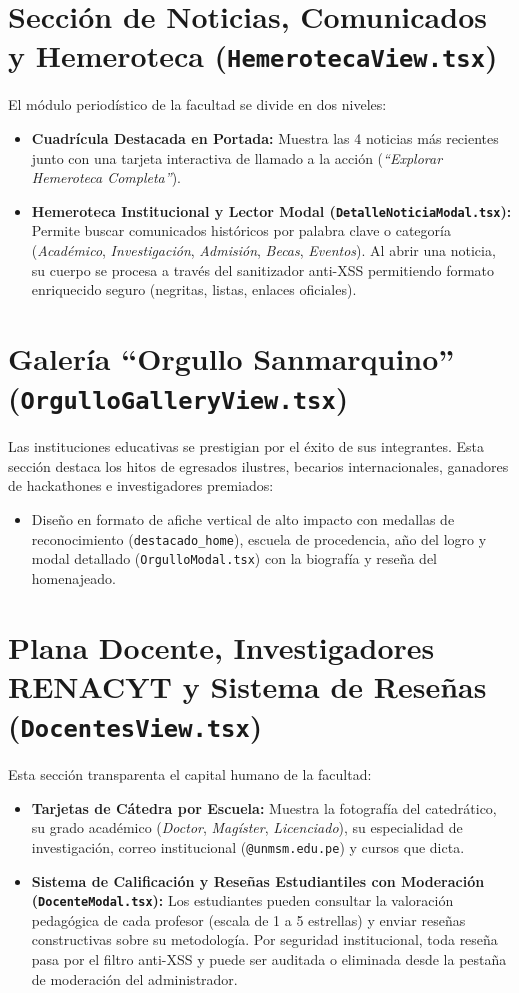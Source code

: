 \documentclass[12pt,a4paper,oneside]{report}
\begin{document}
\section{Sección de Noticias, Comunicados y Hemeroteca (\texttt{HemerotecaView.tsx})}
El módulo periodístico de la facultad se divide en dos niveles:
\begin{itemize}[leftmargin=1.0cm]
  \item \textbf{Cuadrícula Destacada en Portada:} Muestra las 4 noticias más recientes junto con una tarjeta interactiva de llamado a la acción (\textit{``Explorar Hemeroteca Completa''}).
  \item \textbf{Hemeroteca Institucional y Lector Modal (\texttt{DetalleNoticiaModal.tsx}):} Permite buscar comunicados históricos por palabra clave o categoría (\textit{Académico}, \textit{Investigación}, \textit{Admisión}, \textit{Becas}, \textit{Eventos}). Al abrir una noticia, su cuerpo se procesa a través del sanitizador anti-XSS permitiendo formato enriquecido seguro (negritas, listas, enlaces oficiales).
\end{itemize}

\section{Galería ``Orgullo Sanmarquino'' (\texttt{OrgulloGalleryView.tsx})}
Las instituciones educativas se prestigian por el éxito de sus integrantes. Esta sección destaca los hitos de egresados ilustres, becarios internacionales, ganadores de hackathones e investigadores premiados:
\begin{itemize}[leftmargin=1.0cm]
  \item Diseño en formato de afiche vertical de alto impacto con medallas de reconocimiento (\texttt{destacado\_home}), escuela de procedencia, año del logro y modal detallado (\texttt{OrgulloModal.tsx}) con la biografía y reseña del homenajeado.
\end{itemize}

\section{Plana Docente, Investigadores RENACYT y Sistema de Reseñas (\texttt{DocentesView.tsx})}
Esta sección transparenta el capital humano de la facultad:
\begin{itemize}[leftmargin=1.0cm]
  \item \textbf{Tarjetas de Cátedra por Escuela:} Muestra la fotografía del catedrático, su grado académico (\textit{Doctor}, \textit{Magíster}, \textit{Licenciado}), su especialidad de investigación, correo institucional (\texttt{@unmsm.edu.pe}) y cursos que dicta.
  \item \textbf{Sistema de Calificación y Reseñas Estudiantiles con Moderación (\texttt{DocenteModal.tsx}):} Los estudiantes pueden consultar la valoración pedagógica de cada profesor (escala de 1 a 5 estrellas) y enviar reseñas constructivas sobre su metodología. Por seguridad institucional, toda reseña pasa por el filtro anti-XSS y puede ser auditada o eliminada desde la pestaña de moderación del administrador.
\end{itemize}
\end{document}
